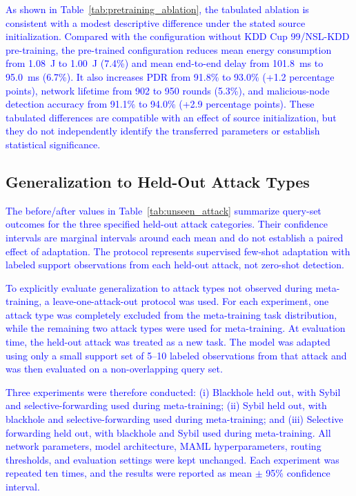 \documentclass[pdflatex,sn-mathphys-num]{sn-jnl}
\newcommand{\Revised}[1]{\textcolor{blue}{#1}}
\begin{document}
\textcolor{blue}{As shown in
Table~\ref{tab:pretraining_ablation}, \Revised{the tabulated ablation is consistent with a modest descriptive difference under the stated source initialization.} Compared with the
configuration without KDD Cup 99/NSL-KDD pre-training, the pre-trained
configuration reduces mean energy consumption from 1.08~J to 1.00~J
(7.4\%) and mean end-to-end delay from 101.8~ms to 95.0~ms (6.7\%).
It also increases PDR from 91.8\% to 93.0\% (+1.2 percentage points),
network lifetime from 902 to 950 rounds (5.3\%), and malicious-node
detection accuracy from 91.1\% to 94.0\% (+2.9 percentage points).
These tabulated differences are compatible with an effect of source initialization, but they do not independently identify the transferred parameters or establish statistical significance.}

\subsection{Generalization to Held-Out Attack Types}
\label{sec:unseen_attack}
\Revised{The before/after values in Table~\ref{tab:unseen_attack} summarize query-set outcomes for the three specified held-out attack categories. Their confidence intervals are marginal intervals around each mean and do not establish a paired effect of adaptation. The protocol represents supervised few-shot adaptation with labeled support observations from each held-out attack, not zero-shot detection.}

\textcolor{blue}{To explicitly evaluate generalization to attack types
not observed during meta-training, a leave-one-attack-out protocol was used.
For each experiment, one attack type was completely excluded from the
meta-training task distribution, while the remaining two attack types were
used for meta-training. At evaluation time, the held-out attack was treated
as a new task. The model was adapted using only a small support set of
5--10 labeled observations from that attack and was then evaluated on a
non-overlapping query set.}

\textcolor{blue}{Three experiments were therefore conducted:
(i) Blackhole held out, with Sybil and selective-forwarding used during
meta-training;
(ii) Sybil held out, with blackhole and selective-forwarding used during
meta-training; and
(iii) Selective forwarding held out, with blackhole and Sybil used during
meta-training. All network parameters, model architecture, MAML
hyperparameters, routing thresholds, and evaluation settings were kept
unchanged. Each experiment was repeated ten times, and the results were
reported as mean $\pm$ 95\% confidence interval.}
\end{document}
